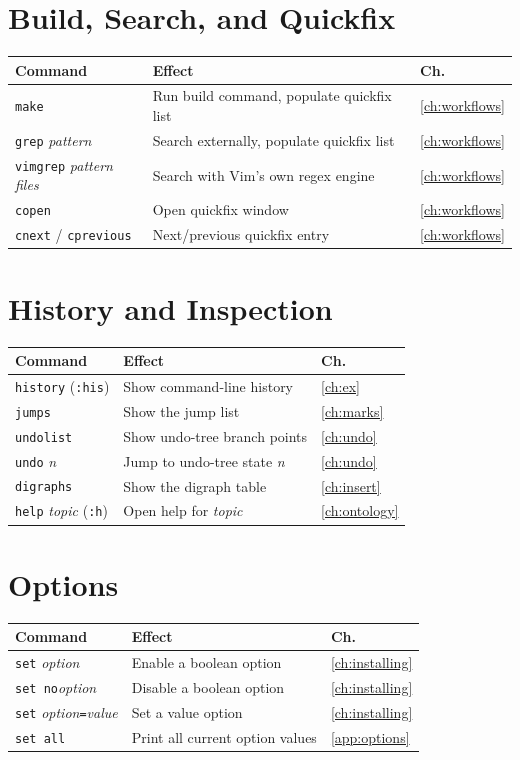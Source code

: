\section{Build, Search, and Quickfix}

\begin{longtable}{@{}l p{9cm} l@{}}
\textbf{Command} & \textbf{Effect} & \textbf{Ch.} \\
\hline
\endhead
\texttt{make} & Run build command, populate quickfix list & \ref{ch:workflows} \\
\texttt{grep} \textit{pattern} & Search externally, populate quickfix list & \ref{ch:workflows} \\
\texttt{vimgrep} \textit{pattern files} & Search with Vim's own regex engine & \ref{ch:workflows} \\
\texttt{copen} & Open quickfix window & \ref{ch:workflows} \\
\texttt{cnext} / \texttt{cprevious} & Next/previous quickfix entry & \ref{ch:workflows} \\
\end{longtable}

\section{History and Inspection}

\begin{longtable}{@{}l p{9cm} l@{}}
\textbf{Command} & \textbf{Effect} & \textbf{Ch.} \\
\hline
\endhead
\texttt{history} (\texttt{:his}) & Show command-line history & \ref{ch:ex} \\
\texttt{jumps} & Show the jump list & \ref{ch:marks} \\
\texttt{undolist} & Show undo-tree branch points & \ref{ch:undo} \\
\texttt{undo} \textit{n} & Jump to undo-tree state \textit{n} & \ref{ch:undo} \\
\texttt{digraphs} & Show the digraph table & \ref{ch:insert} \\
\texttt{help} \textit{topic} (\texttt{:h}) & Open help for \textit{topic} & \ref{ch:ontology} \\
\end{longtable}

\section{Options}

\begin{longtable}{@{}l p{9cm} l@{}}
\textbf{Command} & \textbf{Effect} & \textbf{Ch.} \\
\hline
\endhead
\texttt{set} \textit{option} & Enable a boolean option & \ref{ch:installing} \\
\texttt{set no}\textit{option} & Disable a boolean option & \ref{ch:installing} \\
\texttt{set} \textit{option}\texttt{=}\textit{value} & Set a value option & \ref{ch:installing} \\
\texttt{set all} & Print all current option values & \ref{app:options} \\
\end{longtable}
